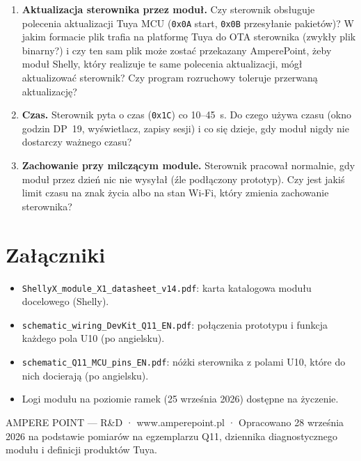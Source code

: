 \documentclass[11pt,a4paper]{article}
\newcommand{\hx}[1]{\texttt{#1}}
\begin{document}
\begin{enumerate}
\item \textbf{Aktualizacja sterownika przez moduł.} Czy sterownik obsługuje polecenia aktualizacji Tuya MCU (\hx{0x0A} start, \hx{0x0B} przesyłanie pakietów)? W jakim formacie plik trafia na platformę Tuya do OTA sterownika (zwykły plik binarny?) i czy ten sam plik może zostać przekazany AmperePoint, żeby moduł Shelly, który realizuje te same polecenia aktualizacji, mógł aktualizować sterownik? Czy program rozruchowy toleruje przerwaną aktualizację?
\item \textbf{Czas.} Sterownik pyta o czas (\hx{0x1C}) co 10--45~s. Do czego używa czasu (okno godzin DP~19, wyświetlacz, zapisy sesji) i co się dzieje, gdy moduł nigdy nie dostarczy ważnego czasu?
\item \textbf{Zachowanie przy milczącym module.} Sterownik pracował normalnie, gdy moduł przez dzień nic nie wysyłał (źle podłączony prototyp). Czy jest jakiś limit czasu na znak życia albo na stan Wi-Fi, który zmienia zachowanie sterownika?
\end{enumerate}

\section{Załączniki}

\begin{itemize}
\item \texttt{ShellyX\_module\_X1\_datasheet\_v14.pdf}: karta katalogowa modułu docelowego (Shelly).
\item \texttt{schematic\_wiring\_DevKit\_Q11\_EN.pdf}: połączenia prototypu i funkcja każdego pola U10 (po angielsku).
\item \texttt{schematic\_Q11\_MCU\_pins\_EN.pdf}: nóżki sterownika z polami U10, które do nich docierają (po angielsku).
\item Logi modułu na poziomie ramek (25 września 2026) dostępne na życzenie.
\end{itemize}

{\color{apmuted}\small AMPERE POINT — R\&D · www.amperepoint.pl · Opracowano 28 września 2026 na podstawie pomiarów na egzemplarzu Q11, dziennika diagnostycznego modułu i definicji produktów Tuya.}
\end{document}
